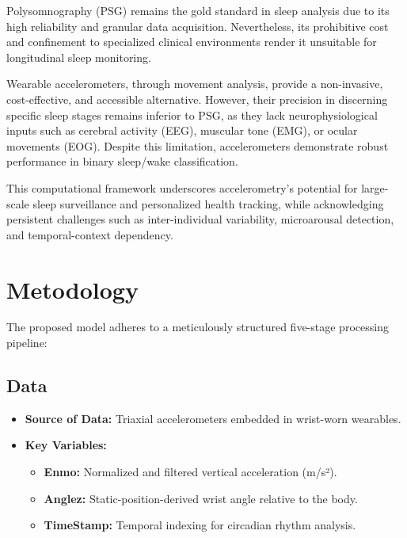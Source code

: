 \documentclass[conference]{IEEEtran}
\begin{document}
Polysomnography (PSG) remains the gold standard in sleep analysis due to its high reliability and granular data acquisition. Nevertheless, its prohibitive cost and confinement to specialized clinical environments render it unsuitable for longitudinal sleep monitoring.

Wearable accelerometers, through movement analysis, provide a non-invasive, cost-effective, and accessible alternative. However, their precision in discerning specific sleep stages remains inferior to PSG, as they lack neurophysiological inputs such as cerebral activity (EEG), muscular tone (EMG), or ocular movements (EOG). Despite this limitation, accelerometers demonstrate robust performance in binary sleep/wake classification.

This computational framework underscores accelerometry's potential for large-scale sleep surveillance and personalized health tracking, while acknowledging persistent challenges such as inter-individual variability, microarousal detection, and temporal-context dependency.


\section{Metodology}

The proposed model adheres to a meticulously structured five-stage processing pipeline:
\subsection{Data}
\begin{itemize}
	\item \textbf{Source of Data:}
	      Triaxial accelerometers embedded in wrist-worn wearables.
	\item \textbf{Key Variables:}
	      \begin{itemize}
		      \item \textbf{Enmo:}  Normalized and filtered vertical acceleration (m/s²).
		      \item \textbf{Anglez:} Static-position-derived wrist angle relative to the body.
                \item \textbf{TimeStamp:} Temporal indexing for circadian rhythm analysis.
	      \end{itemize}
\end{itemize}
\end{document}
